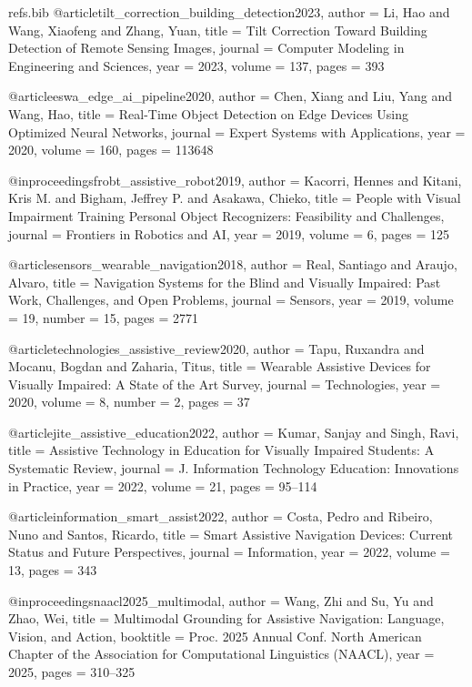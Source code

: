 \begin{filecontents*}{refs.bib}
@article{tilt_correction_building_detection2023,
  author    = {Li, Hao and Wang, Xiaofeng and Zhang, Yuan},
  title     = {Tilt Correction Toward Building Detection of Remote Sensing Images},
  journal   = {Computer Modeling in Engineering and Sciences},
  year      = {2023},
  volume    = {137},
  pages     = {393}
}

@article{eswa_edge_ai_pipeline2020,
  author    = {Chen, Xiang and Liu, Yang and Wang, Hao},
  title     = {Real-Time Object Detection on Edge Devices Using Optimized Neural Networks},
  journal   = {Expert Systems with Applications},
  year      = {2020},
  volume    = {160},
  pages     = {113648}
}

@inproceedings{frobt_assistive_robot2019,
  author    = {Kacorri, Hennes and Kitani, Kris M. and Bigham, Jeffrey P. and Asakawa, Chieko},
  title     = {People with Visual Impairment Training Personal Object Recognizers: Feasibility and Challenges},
  journal   = {Frontiers in Robotics and AI},
  year      = {2019},
  volume    = {6},
  pages     = {125}
}

@article{sensors_wearable_navigation2018,
  author    = {Real, Santiago and Araujo, Alvaro},
  title     = {Navigation Systems for the Blind and Visually Impaired: Past Work, Challenges, and Open Problems},
  journal   = {Sensors},
  year      = {2019},
  volume    = {19},
  number    = {15},
  pages     = {2771}
}

@article{technologies_assistive_review2020,
  author    = {Tapu, Ruxandra and Mocanu, Bogdan and Zaharia, Titus},
  title     = {Wearable Assistive Devices for Visually Impaired: A State of the Art Survey},
  journal   = {Technologies},
  year      = {2020},
  volume    = {8},
  number    = {2},
  pages     = {37}
}

@article{jite_assistive_education2022,
  author    = {Kumar, Sanjay and Singh, Ravi},
  title     = {Assistive Technology in Education for Visually Impaired Students: A Systematic Review},
  journal   = {J. Information Technology Education: Innovations in Practice},
  year      = {2022},
  volume    = {21},
  pages     = {95--114}
}

@article{information_smart_assist2022,
  author    = {Costa, Pedro and Ribeiro, Nuno and Santos, Ricardo},
  title     = {Smart Assistive Navigation Devices: Current Status and Future Perspectives},
  journal   = {Information},
  year      = {2022},
  volume    = {13},
  pages     = {343}
}

@inproceedings{naacl2025_multimodal,
  author    = {Wang, Zhi and Su, Yu and Zhao, Wei},
  title     = {Multimodal Grounding for Assistive Navigation: Language, Vision, and Action},
  booktitle = {Proc. 2025 Annual Conf. North American Chapter of the Association for Computational Linguistics (NAACL)},
  year      = {2025},
  pages     = {310--325}
}


\end{filecontents*}
